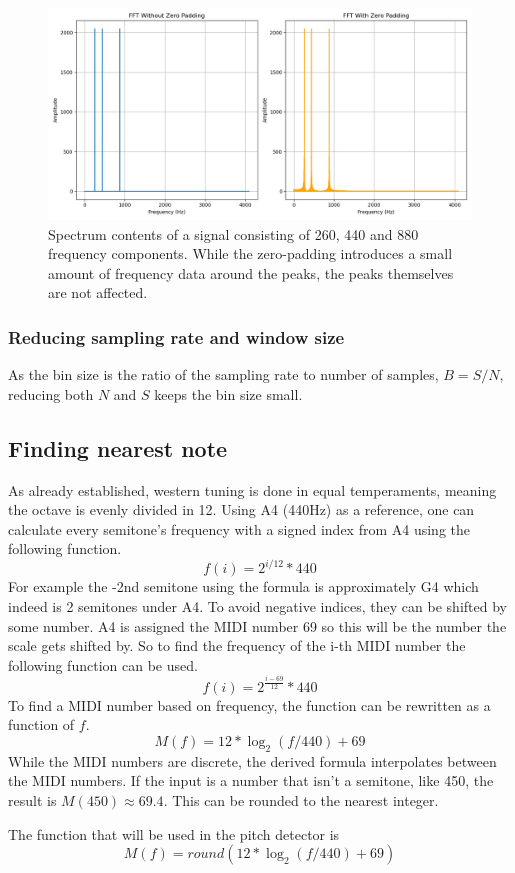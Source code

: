 \begin{figure}[ht]
    \centering
    \includegraphics[width=\textwidth]{./images/zero_pad_spectrum.png}
    \caption{Spectrum contents of a signal consisting of 260, 440 and 880 frequency components. While the zero-padding introduces a small amount of frequency data around the peaks, the peaks themselves are not affected. \label{fig:zeropadSpectrum}}
\end{figure}

\subsubsection{Reducing sampling rate and window size}
As the bin size is the ratio of the sampling rate to number of samples, $B = S/N$, reducing both $N$ and $S$ keeps the bin size small. 

\subsection{Finding nearest note}
As already established, western tuning is done in equal temperaments, meaning the octave is evenly divided in 12. Using A4 (440Hz) as a reference, one can calculate every semitone's frequency with a signed index from A4 using the following function. 
$$f(i) = 2^{i/12}*440$$
For example the -2nd semitone using the formula is approximately G4 which indeed is 2 semitones under A4. To avoid negative indices, they can be shifted by some number. A4 is assigned the MIDI number 69 so this will be the number the scale gets shifted by. So to find the frequency of the i-th MIDI number the following function can be used.
$$f(i) = 2^{\frac{i-69}{12}}*440$$
To find a MIDI number based on frequency, the function can be rewritten as a function of $f$.
$$M(f) = 12*\log_2(f/440)+69$$
While the MIDI numbers are discrete, the derived formula interpolates between the MIDI numbers. If the input is a number that isn't a semitone, like 450, the result is $M(450) \approx 69.4$. This can be rounded to the nearest integer.

The function that will be used in the pitch detector is
$$M(f) = round(12*\log_2(f/440)+69)$$

